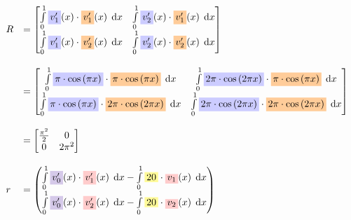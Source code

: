 \documentclass[
final,
a4paper,
oneside,
parskip=full,
headings=standardclasses,
headings=big,
pointednumbers,
fleqn
]{scrartcl}
\newcommand{\tfillb}[1]{\tfillc[#1][blue!20]}
\newcommand{\tfillo}[1]{\tfillc[#1][orange!40]}
\newcommand{\tfilly}[1]{\tfillc[#1][yellow!40]}
\newcommand{\tfillr}[1]{\tfillc[#1][red!20]}
\newcommand{\tfillv}[1]{\tfillc[#1][Violet!20]}
\newcommand*\difx{\; \mathop{}\!\mathrm{d}x}
\newcommand{\f}[2]{\frac{#1}{#2}}
\newcommand{\kl}[1]{{\left( #1 \right)}}
\begin{document}
    {\setlength{\abovedisplayskip}{-6pt}
    \setlength{\belowdisplayskip}{-12pt}
    \begin{align*}
        \begin{array}{ll}
            R & = \begin{bmatrix}
                \int\limits_{0}^{1}{\tfillb{$v_1'$}\kl{x} \cdot \tfillo{$v_1'$}\kl{x} \difx} &
                \int\limits_{0}^{1}{\tfillb{$v_2'$}\kl{x} \cdot \tfillo{$v_1'$}\kl{x} \difx} \\
                \int\limits_{0}^{1}{\tfillb{$v_1'$}\kl{x} \cdot \tfillo{$v_2'$}\kl{x} \difx} & 
                \int\limits_{0}^{1}{\tfillb{$v_2'$}\kl{x} \cdot \tfillo{$v_2'$}\kl{x} \difx} \\
            \end{bmatrix} \\
            & \\
            & = \begin{bmatrix}
                \int\limits_{0}^{1}{\tfillb{$\pi \cdot \cos\kl{\pi x}$}     \cdot \tfillo{$\pi \cdot \cos\kl{\pi x}$} \difx} &
                \int\limits_{0}^{1}{\tfillb{$2 \pi \cdot \cos\kl{2 \pi x}$} \cdot \tfillo{$\pi \cdot \cos\kl{\pi x}$} \difx} \\
                \int\limits_{0}^{1}{\tfillb{$\pi \cdot \cos\kl{\pi x}$}     \cdot \tfillo{$2 \pi \cdot \cos\kl{2 \pi x}$} \difx} & 
                \int\limits_{0}^{1}{\tfillb{$2 \pi \cdot \cos\kl{2 \pi x}$} \cdot \tfillo{$2 \pi \cdot \cos\kl{2 \pi x}$} \difx} \\
            \end{bmatrix} \\
            & \\
            & = \begin{bmatrix}
                \f{\pi^2}{2} & 0 \\
                0             & 2\pi^2
            \end{bmatrix} \\
            & \\
            r & = \begin{pmatrix}
                \int\limits_{0}^{1}{\tfillv{$v_0'$}\kl{x} \cdot \tfillr{$v_1'$}\kl{x} \difx} -
                \int\limits_{0}^{1}{\tfilly{$20$}         \cdot \tfillr{$v_1$}\kl{x} \difx} \\
                \int\limits_{0}^{1}{\tfillv{$v_0'$}\kl{x} \cdot \tfillr{$v_2'$}\kl{x} \difx} -
                \int\limits_{0}^{1}{\tfilly{$20$}         \cdot \tfillr{$v_2$}\kl{x} \difx}
            \end{pmatrix} \\

\end{array}
\end{align*}}
\end{document}
